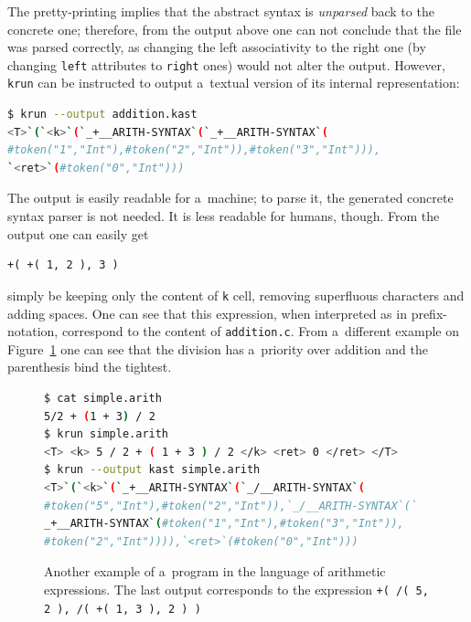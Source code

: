 \documentclass{fithesis3}
\newcommand{\krun}{\texttt{krun}\xspace}
\begin{document}
The pretty-printing implies that the abstract syntax is \textit{unparsed} back to the concrete one; therefore, from the output above one can not conclude that the file was parsed correctly, as changing the left associativity to the right one (by changing \texttt{left} attributes to \texttt{right} ones) would not alter the output. However, \krun can be instructed to output a~textual version of its internal representation:
\begin{lstlisting}[language=bash]
$ krun --output addition.kast
<T>`(`<k>`(`_+__ARITH-SYNTAX`(`_+__ARITH-SYNTAX`(
#token("1","Int"),#token("2","Int")),#token("3","Int"))),
`<ret>`(#token("0","Int")))
\end{lstlisting}
The output is easily readable for a~machine; to parse it, the generated concrete syntax parser is not needed. It is less readable for humans, though. From the output one can easily get
\begin{lstlisting}
+( +( 1, 2 ), 3 )
\end{lstlisting}
simply be keeping only the content of \texttt{k} cell, removing superfluous characters and adding spaces. One can see that this expression, when interpreted as in prefix-notation, correspond to the content of \texttt{addition.c}. From a~different example on Figure~\ref{arithMixed} one can see that the division has a~priority over addition and the parenthesis bind the tightest.


\begin{figure}
\begin{lstlisting}[language=bash]
$ cat simple.arith
5/2 + (1 + 3) / 2
$ krun simple.arith
<T> <k> 5 / 2 + ( 1 + 3 ) / 2 </k> <ret> 0 </ret> </T>
$ krun --output kast simple.arith
<T>`(`<k>`(`_+__ARITH-SYNTAX`(`_/__ARITH-SYNTAX`(
#token("5","Int"),#token("2","Int")),`_/__ARITH-SYNTAX`(`
_+__ARITH-SYNTAX`(#token("1","Int"),#token("3","Int")),
#token("2","Int")))),`<ret>`(#token("0","Int")))
\end{lstlisting}
\caption{Another example of a~program in the language of arithmetic expressions. The last output corresponds to the expression \lstinline{+( /( 5, 2 ), /( +( 1, 3 ), 2 ) )}{}}
\label{arithMixed}
\end{figure}
\end{document}
